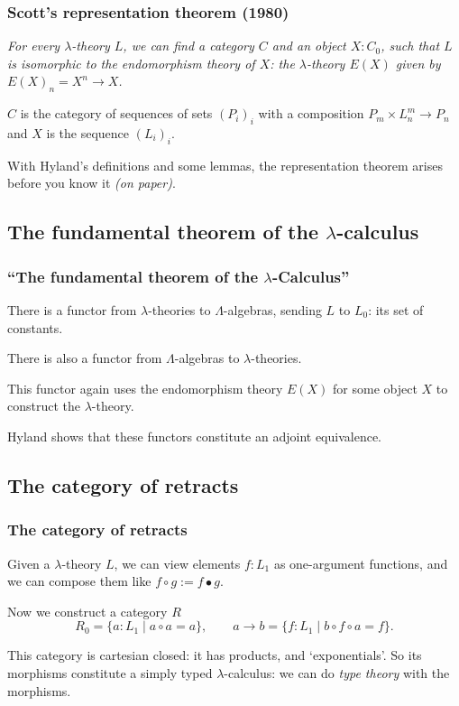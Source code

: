 \documentclass[aspectratio=169]{fancyslides} %
\begin{document}
  \begin{frame}
    \frametitle{Scott's representation theorem (1980)}

    \textit{For every $ \lambda $-theory $ L $, we can find a category $ C $ and an object $ X : C_0 $, such that $ L $ is isomorphic to the \textit{endomorphism theory} of $ X $: the $ \lambda $-theory $ E(X) $ given by $ E(X)_n = X^n \to X $.}

    $ C $ is the category of sequences of sets $ (P_i)_i $ with a composition $ P_m \times L_n^m \to P_n $ and $ X $ is the sequence $ (L_i)_i $.

    With Hyland's definitions and some lemmas, the representation theorem arises before you know it \textit{(on paper)}.
  \end{frame}

  \subsection{The fundamental theorem of the \texorpdfstring{$\lambda$}{lambda}-calculus}
  \begin{frame}
    \frametitle{``The fundamental theorem of the $ \lambda $-Calculus''}

    There is a functor from $ \lambda $-theories to $ \Lambda $-algebras, sending $ L $ to $ L_0 $: its set of constants.

    \pause

    There is also a functor from $ \Lambda $-algebras to $ \lambda $-theories.

    This functor again uses the endomorphism theory $ E(X) $ for some object $ X $ to construct the $ \lambda $-theory.

    \pause

    Hyland shows that these functors constitute an adjoint equivalence.
  \end{frame}

  \subsection{The category of retracts}
  \begin{frame}
    \frametitle{The category of retracts}

    Given a $ \lambda $-theory $ L $, we can view elements $ f: L_1 $ as one-argument functions, and we can compose them like $ f \circ g := f \bullet g $.

    Now we construct a category $ R $
    \[ R_0 = \{ a : L_1 \mid a \circ a = a \}, \qquad a \to b = \{ f: L_1 \mid b \circ f \circ a = f \}. \]

    \pause

    This category is cartesian closed: it has products, and `exponentials'. So its morphisms constitute a simply typed $ \lambda $-calculus: we can do \textit{type theory} with the morphisms.
  \end{frame}
\end{document}
